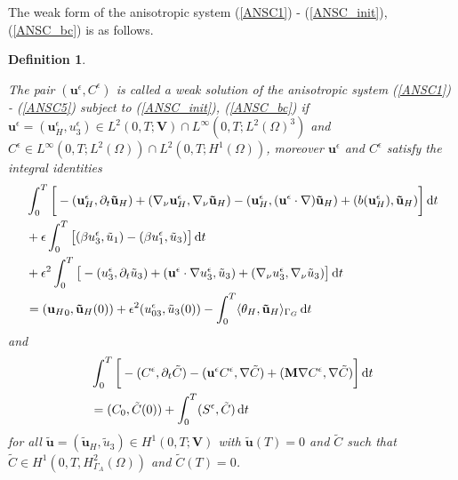 \documentclass[11pt]{article}
\newtheorem{definition}{Definition}
\newcommand*\diff{\mathop{}\!\mathrm{d}}
\begin{document}
The weak form of the anisotropic system (\ref{ANSC1}) - (\ref{ANSC_init}), (\ref{ANSC_bc}) is as follows.

\begin{definition} \label{definitionanisotropicWF}

The pair $(\mathbf{u}^\epsilon, C^\epsilon)$ is called a weak solution of the anisotropic system (\ref{ANSC1}) - (\ref{ANSC5}) subject to (\ref{ANSC_init}), (\ref{ANSC_bc}) if $\mathbf{u}^\epsilon = (\mathbf{u}^\epsilon_H, u^\epsilon_3) \in L^2 (0,T ; \mathbf{V}) \cap L^\infty (0, T; L^2 (\Omega)^3)$ and $C^\epsilon \in L^\infty (0,T; L^2(\Omega)) \cap L^2 (0,T; H^1(\Omega))$, moreover $\mathbf{u}^\epsilon$ and $C^\epsilon$ satisfy the integral identities
%
\begin{equation}
\begin{split}
& \int_0^T \bigg [ -(\mathbf{u}^\epsilon_H, \partial_t \mathbf{\tilde{u}}_H) + (\nabla_\nu \mathbf{u}^\epsilon_H, \nabla_\nu \mathbf{\tilde{u}}_H) - (\mathbf{u}^\epsilon_H, (\mathbf{u}^\epsilon \cdot \nabla) \mathbf{\tilde{u}}_H) + (b(\mathbf{u}^\epsilon_H), \mathbf{\tilde{u}}_H) \bigg ] \diff t \\
& + \epsilon \int_0 ^ T \big [ (\beta u_3 ^\epsilon, \tilde{u}_1) - (\beta u_1^\epsilon, \tilde{u}_3) \big ] \diff t\\
& + \epsilon^2 \int _0 ^ T \big [ -(u_3^\epsilon, \partial_t \tilde{u}_3) +(\mathbf{u}^\epsilon \cdot \nabla u_3 ^ \epsilon, \tilde{u}_3) + (\nabla_\nu u_3^\epsilon, \nabla_\nu \tilde{u}_3) \big ] \diff t \\
& = ({\mathbf{u}_H}_0, \mathbf{\tilde{u}}_H(0)) + \epsilon^2 (u_{03}^\epsilon, \tilde{u}_3 (0)) - \int_0^T \langle \theta_H, \mathbf{\tilde{u}}_H \rangle_{\Gamma_G} \diff t \raisetag{20pt} \label{anisotropicWF_U}
\end{split}
\end{equation}
%
and
%
\begin{equation}
\begin{split}
& \int_0^T \bigg [ -(C^\epsilon, \partial_t \tilde{C}) -(\mathbf{u}^\epsilon C^\epsilon, \nabla \tilde{C}) + (\mathbf{M} \nabla C^\epsilon, \nabla \tilde{C}) \bigg ] \diff t \\
& =  (C_0, \tilde{C} (0)) + \int_0^T (S^\epsilon,\tilde{C}) \diff t \raisetag{20pt} \label{anisotropicWF_C}
\end{split}
\end{equation}
%
for all $\mathbf{\tilde{u}} = (\mathbf{\tilde{u}}_H, \tilde{u}_3) \in H^1 (0,T;\mathbf{V})$ with $\mathbf{\tilde{u}}(T) = 0$ and $\tilde{C}$ such that $\tilde{C} \in H^1 (0,T, H^2_{\Gamma_A} (\Omega))$ and $\tilde{C} (T) = 0$.
\end{definition}
\end{document}
